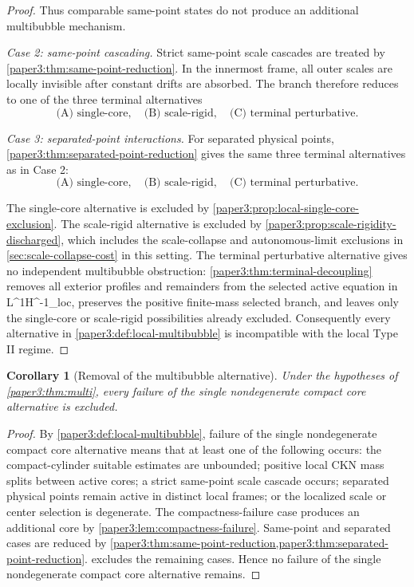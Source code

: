 \documentclass[11pt]{amsart}
\def\({}%
\def\){}%
\def\mathrm#1{#1}%
\theoremstyle{plain}
\newtheorem{corollary}[corollary]{Corollary}
\theoremstyle{definition}
\theoremstyle{remark}
\begin{document}
\begin{proof}
Thus comparable same-point states do not produce an additional multibubble
mechanism.
\par
\textit{Case 2: same-point cascading.}
Strict same-point scale cascades are treated by
\cref{paper3:thm:same-point-reduction}.  In the innermost frame, all outer scales are
locally invisible after constant drifts are absorbed.  The branch therefore
reduces to one of the three terminal alternatives
\[
  \text{(A) single-core},\quad \text{(B) scale-rigid},\quad \text{(C) terminal perturbative}.
\]
\par
\textit{Case 3: separated-point interactions.}
For separated physical points, \cref{paper3:thm:separated-point-reduction} gives the same
three terminal alternatives as in Case 2:
\[
  \text{(A) single-core},\quad \text{(B) scale-rigid},\quad \text{(C) terminal perturbative}.
\]

The single-core alternative is excluded by \cref{paper3:prop:local-single-core-exclusion}.  The
scale-rigid alternative is excluded by \cref{paper3:prop:scale-rigidity-discharged}, which includes
the scale-collapse and autonomous-limit exclusions in \cref{sec:scale-collapse-cost} in this setting.  The
terminal perturbative alternative gives no independent multibubble obstruction:
\cref{paper3:thm:terminal-decoupling} removes all exterior profiles and remainders from
the selected active equation in \(L^1H^{-1}_{\mathrm{loc}}\), preserves the positive
finite-mass selected branch, and leaves only the single-core or scale-rigid
possibilities already excluded.  Consequently every alternative in
\cref{paper3:def:local-multibubble} is incompatible with the local Type II regime.
\end{proof}

\begin{corollary}[Removal of the multibubble alternative]\label{paper3:cor:multi-removal}
Under the hypotheses of \cref{paper3:thm:multi}, every failure of the single
nondegenerate compact core alternative is excluded.
\end{corollary}

\begin{proof}
By \cref{paper3:def:local-multibubble}, failure of the single nondegenerate compact
core alternative means that at least one of the following occurs: the
compact-cylinder suitable estimates are unbounded; positive local CKN mass splits
between active cores; a strict same-point scale cascade occurs; separated
physical points remain active in distinct local frames; or the localized scale
or center selection is degenerate.  The compactness-failure case produces an
additional core by \cref{paper3:lem:compactness-failure}.  Same-point and separated
cases are reduced by \cref{paper3:thm:same-point-reduction,paper3:thm:separated-point-reduction}.
 excludes the remaining cases.  Hence no failure of the
single nondegenerate compact core alternative remains.
\end{proof}
\end{document}
